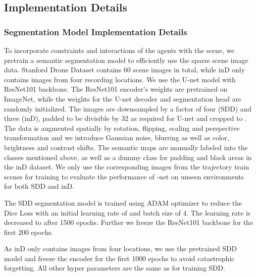 \documentclass[final]{cvpr}
\begin{document}
\subsection{Implementation Details}
\subsubsection{Segmentation Model Implementation Details}
To incorporate constraints and interactions of the agents with the scene, we pretrain a semantic segmentation model to efficiently use the sparse scene image data. Stanford Drone Dataset contains 60 scene images in total, while inD only contains images from four recording locations. We use the U-net model \cite{unet} with ResNet101 \cite{he2016deep} backbone. The ResNet101 encoder's weights are pretrained on ImageNet, while the weights for the U-net decoder and segmentation head are randomly initialized. The images are downsampled by a factor of four (SDD) and three (inD), padded to be divisible by 32 as required for U-net and cropped to . The data is augmented spatially by rotation, flipping, scaling and perspective transformation and we introduce Gaussian noise, blurring as well as color, brightness and contrast shifts. The semantic maps are manually labeled into the  classes mentioned above, as well as a dummy class for padding and black areas in the inD dataset. We only use the corresponding images from the trajectory train scenes for training to evaluate the performance of -net on unseen environments for both SDD and inD. 

The SDD segmentation model is trained using ADAM optimizer to reduce the Dice Loss \cite{sudre2017generalised} with an initial learning rate of  and batch size of 4. The learning rate is decreased to  after 1500 epochs. Further we freeze the ResNet101 backbone for the first 200 epochs. 

As inD only contains images from four locations, we use the pretrained SDD model and freeze the encoder for the first 1000 epochs to avoid catastrophic forgetting. All other hyper parameters are the same as for training SDD.
\end{document}
